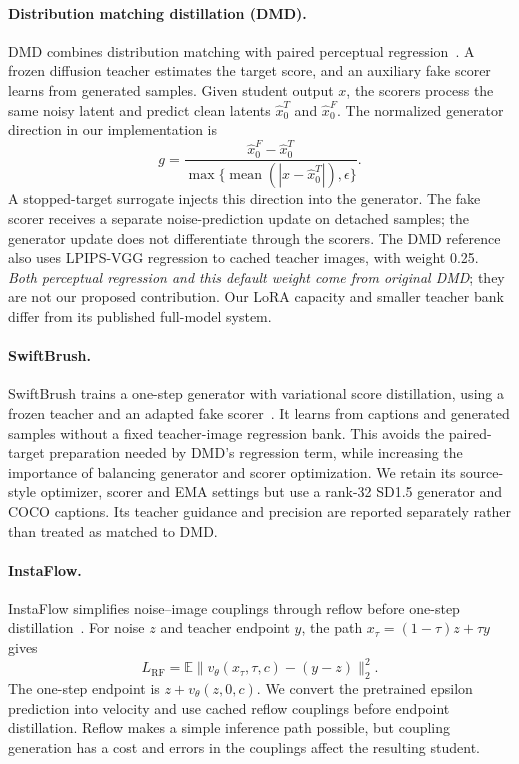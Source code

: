 \documentclass[10pt,twocolumn,letterpaper]{article}
\begin{document}
\paragraph{Distribution matching distillation (DMD).}
DMD combines distribution matching with paired perceptual
regression~\cite{yin2024dmd}. A frozen diffusion teacher estimates the target
score, and an auxiliary fake scorer learns from generated samples. Given
student output $x$, the scorers process the same noisy latent and predict
clean latents $\hat x_0^T$ and $\hat x_0^F$. The normalized generator
direction in our implementation is
\begin{equation}
g=\frac{\hat x_0^F-\hat x_0^T}
 {\max\{\operatorname{mean}(|x-\hat x_0^T|),\epsilon\}}.
\end{equation}
A stopped-target surrogate injects this direction into the generator.
The fake scorer receives a separate noise-prediction update on detached
samples; the generator update does not differentiate through the scorers.
The DMD reference also uses LPIPS-VGG regression to cached teacher images,
with weight 0.25. \emph{Both perceptual regression and this default weight
come from original DMD}; they are not our proposed contribution. Our LoRA
capacity and smaller teacher bank differ from its published full-model
system.

\paragraph{SwiftBrush.}
SwiftBrush trains a one-step generator with variational score distillation,
using a frozen teacher and an adapted fake
scorer~\cite{nguyen2024swiftbrush}. It learns from captions and generated
samples without a fixed teacher-image regression bank. This avoids the
paired-target preparation needed by DMD's regression term, while increasing
the importance of balancing generator and scorer optimization. We retain
its source-style optimizer, scorer and EMA settings but use a rank-32
SD1.5 generator and COCO captions. Its teacher guidance and precision are
reported separately rather than treated as matched to DMD.

\paragraph{InstaFlow.}
InstaFlow simplifies noise--image couplings through reflow before one-step
distillation~\cite{liu2024instaflow}. For noise $z$ and teacher endpoint $y$,
the path $x_\tau=(1-\tau)z+\tau y$ gives
\begin{equation}
L_{\mathrm{RF}}=\mathbb E\|v_\theta(x_\tau,\tau,c)-(y-z)\|_2^2.
\end{equation}
The one-step endpoint is $z+v_\theta(z,0,c)$. We convert the pretrained
epsilon prediction into velocity and use cached reflow couplings before
endpoint distillation. Reflow makes a simple inference path possible, but
coupling generation has a cost and errors in the couplings affect the
resulting student.
\end{document}
